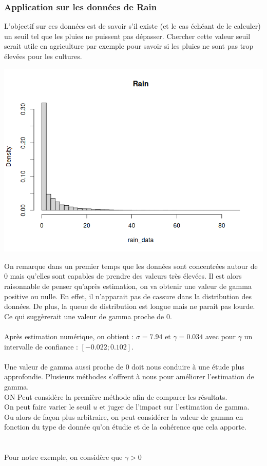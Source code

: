 \documentclass{article}
\begin{document}
\subsubsection{Application sur les données de Rain}

L'objectif sur ces données est de savoir s'il existe (et le cas échéant de le calculer) un seuil tel que les pluies ne puissent pas dépasser.
Chercher cette valeur seuil serait utile en agriculture par exemple pour savoir si les pluies ne sont pas trop élevées pour les cultures.

\begin{center}
	\includegraphics[scale=0.8]{./images/rainhisto.png} 
\end{center}

On remarque dans un premier temps que les données sont concentrées autour de 0 mais qu'elles sont capables de prendre des valeurs très élevées.
Il est alors raisonnable de penser qu'après estimation, on va obtenir une valeur de gamma positive ou nulle. En effet, il n'apparait pas de cassure dans la distribution des données.
De plus, la queue de distribution est longue mais ne parait pas lourde. Ce qui suggèrerait une valeur de gamma proche de 0.
\\
\\
Après estimation numérique, on obtient : $\sigma = 7.94$ et $\gamma = 0.034$ avec pour $\gamma$ un intervalle de confiance : $[-0.022 ; 0.102]$.
\\
\\ 
Une valeur de gamma aussi proche de 0 doit nous conduire à une étude plus approfondie.
Plusieurs méthodes s'offrent à nous pour améliorer l'estimation de gamma. 
\\
ON Peut considère la première méthode afin de comparer les résultats.
\\
On peut faire varier le seuil $u$ et juger de l'impact sur l'estimation de gamma.
\\
Ou alors de façon plus arbitraire, on peut considérer la valeur de gamma en fonction du type de donnée qu'on étudie et de la cohérence que cela apporte.
\\
\\
\\
Pour notre exemple, on considère que $\gamma > 0$
\end{document}
